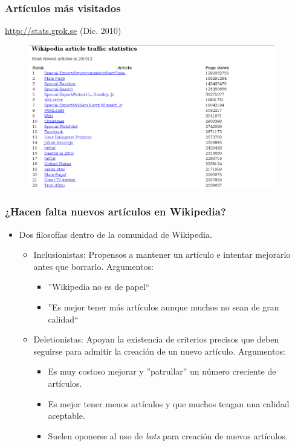 \begin{frame}
\frametitle{Artículos más visitados}

\url{http://stats.grok.se} (Dic. 2010)

\begin{figure}[htp]
\centering
\includegraphics[width=10.75cm]{figs/wkp-traffic-dec2010.png}
\end{figure}

\end{frame}


\begin{frame}
\frametitle{¿Hacen falta nuevos artículos en Wikipedia?}

\begin{itemize}
 \item Dos filosofías dentro de la comunidad de Wikipedia.
  \begin{itemize}
   \item \alert{Inclusionistas}: Propensos a mantener un artículo e intentar
mejorarlo antes que borrarlo. Argumentos:
      \begin{itemize}
       \item ''Wikipedia no es de papel``
       \item ''Es mejor tener más artículos aunque muchos no sean de gran calidad``
      \end{itemize}
   \item \alert{Deletionistas}: Apoyan la existencia de criterios precisos que deben
seguirse para admitir la creación de un nuevo artículo. Argumentos:
      \begin{itemize}
       \item Es muy costoso mejorar y ''patrullar'' un número creciente de artículos.
       \item Es mejor tener menos artículos y que muchos tengan una calidad aceptable.
       \item Suelen oponerse al uso de \textit{bots} para creación de nuevos artículos.
      \end{itemize}
  \end{itemize}

\end{itemize}

\end{frame}

